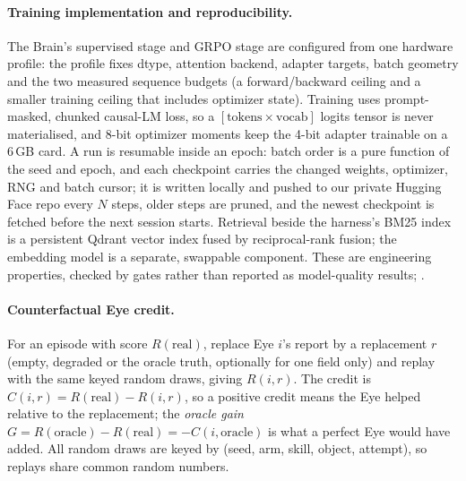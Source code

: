 \paragraph{Training implementation and reproducibility.} The Brain's supervised stage and GRPO stage are configured from one hardware profile: the profile fixes dtype, attention backend, adapter targets, batch geometry and the two measured sequence budgets (a forward/backward ceiling and a smaller training ceiling that includes optimizer state). Training uses prompt-masked, chunked causal-LM loss, so a $[\text{tokens}\times\text{vocab}]$ logits tensor is never materialised, and 8-bit optimizer moments keep the 4-bit adapter trainable on a 6\,GB card. A run is resumable inside an epoch: batch order is a pure function of the seed and epoch, and each checkpoint carries the changed weights, optimizer, RNG and batch cursor; it is written locally and pushed to our private Hugging Face repo every $N$ steps, older steps are pruned, and the newest checkpoint is fetched before the next session starts. Retrieval beside the harness's BM25 index is a persistent Qdrant vector index fused by reciprocal-rank fusion; the embedding model is a separate, swappable component. These are engineering properties, checked by gates rather than reported as model-quality results; .

\paragraph{Counterfactual Eye credit.}
For an episode with score $R(\text{real})$, replace Eye $i$'s report by a replacement $r$ (empty, degraded or the oracle truth, optionally for one field only) and replay with the same keyed random draws, giving $R(i,r)$.
The credit is $C(i,r)=R(\text{real})-R(i,r)$, so a positive credit means the Eye helped relative to the replacement; the \emph{oracle gain} $G=R(\text{oracle})-R(\text{real})=-C(i,\text{oracle})$ is what a perfect Eye would have added.
All random draws are keyed by (seed, arm, skill, object, attempt), so replays share common random numbers.
